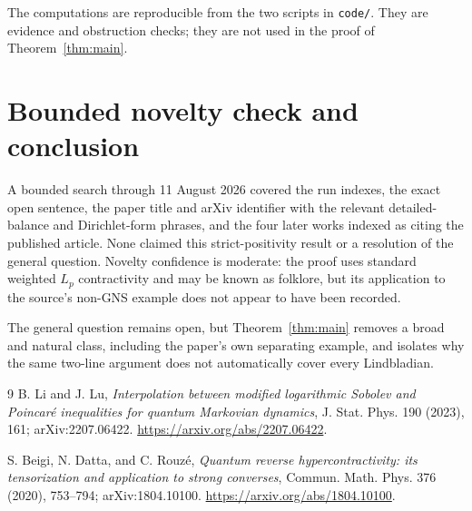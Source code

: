 \documentclass[11pt]{article}
\begin{document}
The computations are reproducible from the two scripts in \texttt{code/}.
They are evidence and obstruction checks; they are not used in the proof of
Theorem~\ref{thm:main}.

\section{Bounded novelty check and conclusion}

A bounded search through 11 August 2026 covered the run indexes, the exact
open sentence, the paper title and arXiv identifier with the relevant
detailed-balance and Dirichlet-form phrases, and the four later works indexed
as citing the published article.  None claimed this strict-positivity result
or a resolution of the general question.  Novelty confidence is moderate:
the proof uses standard weighted $L_p$ contractivity and may be known as
folklore, but its application to the source's non-GNS example does not appear
to have been recorded.

The general question remains open, but Theorem~\ref{thm:main} removes a broad
and natural class, including the paper's own separating example, and isolates
why the same two-line argument does not automatically cover every
Lindbladian.

\begin{thebibliography}{9}
B. Li and J. Lu,
\emph{Interpolation between modified logarithmic Sobolev and Poincar\'e
inequalities for quantum Markovian dynamics},
J. Stat. Phys. 190 (2023), 161; arXiv:2207.06422.
\url{https://arxiv.org/abs/2207.06422}.

S. Beigi, N. Datta, and C. Rouz\'e,
\emph{Quantum reverse hypercontractivity: its tensorization and application
to strong converses},
Commun. Math. Phys. 376 (2020), 753--794; arXiv:1804.10100.
\url{https://arxiv.org/abs/1804.10100}.
\end{thebibliography}
\end{document}
